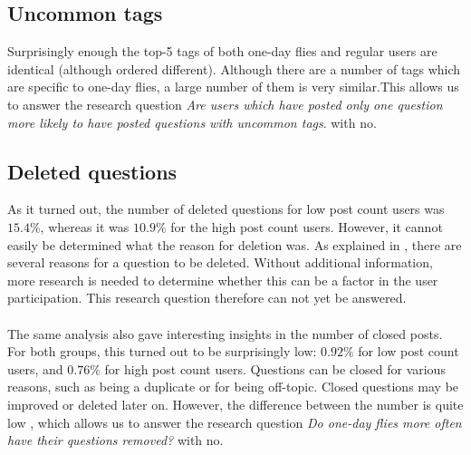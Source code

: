 \documentclass[conference]{IEEEtran}
\begin{document}
\subsection{Uncommon tags}

Surprisingly enough the top-5 tags of both one-day flies and regular users are identical (although ordered different). Although there are a number of tags which are specific to one-day flies, a large number of them is very similar.This allows us to answer the research question \textit{Are users which have posted only one question more likely to have posted questions with uncommon tags}. with no.

\subsection{Deleted questions}
As it turned out, the number of deleted questions for low post count users was $15.4\%$, whereas it was $10.9\%$ for the high post count users. However, it cannot easily be determined what the reason for deletion was. As explained in \cite{correa2014chaff}, there are several reasons for a question to be deleted. Without additional information, more research is needed to determine whether this can be a factor in the user participation. This research question therefore can not yet be answered.
\\
\\
The same analysis also gave interesting insights in the number of closed posts. For both groups, this turned out to be surprisingly low: $0.92\%$ for low post count users, and $0.76\%$ for high post count users. Questions can be closed for various reasons, such as being a duplicate or for being off-topic. Closed questions may be improved or deleted later on. However, the difference between the number is quite low , which allows us to answer the research question \textit{Do one-day flies more often have their questions removed?} with no.
\end{document}
